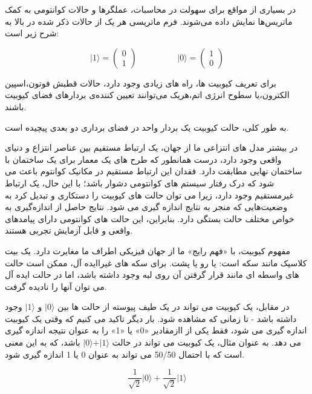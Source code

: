 \documentclass{book}
\begin{document}
در بسیاری از مواقع برای سهولت در محاسبات، عملگر‌ها و حالات کوانتومی به کمک ماتریس‌ها نمایش داده ‌می‌شوند. فرم ماتریسی هر یک از حالات ذکر شده در بالا به شرح زیر است:

\begin{equation}\label{basis ket}
	\vert 1 \rangle = \begin{pmatrix} 0 \\ 1 \end{pmatrix}
	\hspace{2cm}
	\vert 0 \rangle = \begin{pmatrix} 1 \\ 0 \end{pmatrix}	
\end{equation}

برای تعریف کیوبیت ها، راه های زیادی وجود دارد، حالات قطبش فوتون،‌اسپین الکترون،‌یا سطوح انرژی اتم،‌هریک می‌توانند تعیین کننده‌ی بردار‌های فضای کیوبیت باشند.

 به طور کلی، حالت کیوبیت یک بردار واحد در فضای برداری دو بعدی پیچیده است.\pagebreak
 
در بیشتر مدل های انتزاعی ما از جهان، یک ارتباط مستقیم بین عناصر انتزاع و دنیای واقعی وجود دارد، درست همانطور که طرح های یک معمار برای یک ساختمان با ساختمان نهایی مطابقت دارد. فقدان این ارتباط مستقیم در مکانیک کوانتوم باعث می شود که درک رفتار سیستم های کوانتومی دشوار باشد؛ با این حال، یک ارتباط غیرمستقیم وجود دارد، زیرا می توان حالت های کیوبیت را دستکاری و تبدیل کرد به وضعیت‌هایی که منجر به نتایج اندازه گیری می شود. نتایج حاصل از اندازه‌گیری به خواص مختلف حالت بستگی دارد. بنابراین، این حالت های کوانتومی دارای پیامدهای واقعی و قابل آزمایش تجربی هستند.

مفهوم کیوبیت، با «فهم رایج» ما از جهان فیزیکی اطراف ما مغایرت دارد. یک بیت کلاسیک مانند سکه است: یا رو یا پشت. برای سکه های غیراایده آل، ممکن است حالت های واسطه ای مانند قرار گرفتن آن روی لبه وجود داشته باشد، اما در حالت ایده آل می توان آنها را نادیده گرفت. 

در مقابل، یک کیوبیت می تواند در یک طیف پیوسته از حالت ها بین $\vert0\rangle$ و $\vert1\rangle$ وجود داشته باشد - تا زمانی که مشاهده شود. بار دیگر تاکید می کنیم که وقتی یک کیوبیت اندازه گیری می شود، فقط یکی از اازمقادیر «0» یا «1» را به عنوان نتیجه اندازه گیری می دهد. به عنوان مثال، یک کیوبیت می تواند در حالت
 $\vert0\rangle + \vert1\rangle$ باشد، که به این معنی است که با احتمال 50/50 می تواند به عنوان 0 یا 1 اندازه گیری شود.


\begin{center}
	\begin{equation}\label{superposition}
		\frac{1}{\sqrt{2}} \vert 0\rangle + \frac{1}{\sqrt{2}} \vert 1\rangle
	\end{equation}
	
\end{center}
\end{document}
